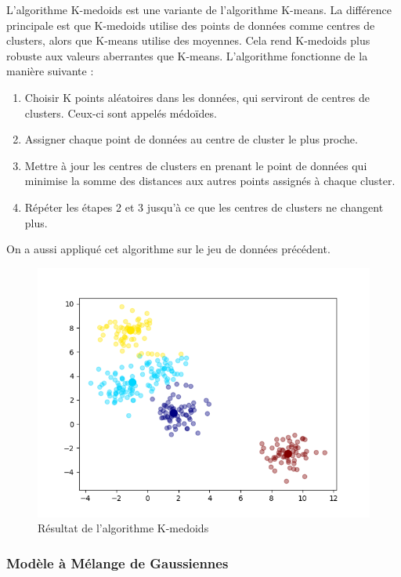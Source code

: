 \documentclass[french,a4paper,18pt]{article}
\begin{document}
L'algorithme K-medoids est une variante de l'algorithme K-means. 
La différence principale est que K-medoids utilise des points de données comme centres de clusters, alors que K-means utilise des moyennes.
Cela rend K-medoids plus robuste aux valeurs aberrantes que K-means.
L'algorithme fonctionne de la manière suivante :
\begin{enumerate}
    \item Choisir K points aléatoires dans les données, qui serviront de centres de clusters.
    Ceux-ci sont appelés médoïdes.
    \item Assigner chaque point de données au centre de cluster le plus proche.
    \item Mettre à jour les centres de clusters en prenant le point de données qui minimise la somme des distances aux autres points assignés à chaque cluster.
    \item Répéter les étapes 2 et 3 jusqu'à ce que les centres de clusters ne changent plus.
\end{enumerate}

On a aussi appliqué cet algorithme sur le jeu de données précédent.
\begin{figure}[h!]
    \centering
    \includegraphics[scale=0.5]{images/short_simulation_kmedoids.png}
    \caption{Résultat de l'algorithme K-medoids}\label{fig:short_simulation_kmedoids}
\end{figure}

\subsubsection{Modèle à Mélange de Gaussiennes}
\end{document}
